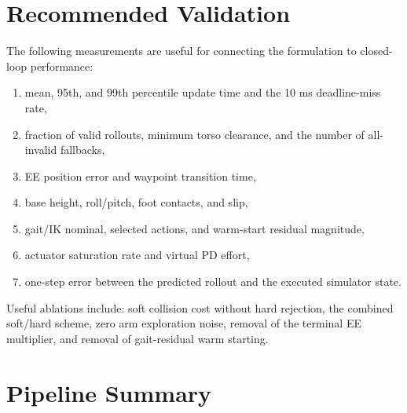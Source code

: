 \documentclass[11pt,a4paper]{article}
\begin{document}
\section{Recommended Validation}

The following measurements are useful for connecting the formulation to
closed-loop performance:
\begin{enumerate}
  \item mean, 95th, and 99th percentile update time and the 10 ms deadline-miss
        rate,
  \item fraction of valid rollouts, minimum torso clearance, and the number of
        all-invalid fallbacks,
  \item EE position error and waypoint transition time,
  \item base height, roll/pitch, foot contacts, and slip,
  \item gait/IK nominal, selected actions, and warm-start residual magnitude,
  \item actuator saturation rate and virtual PD effort,
  \item one-step error between the predicted rollout and the executed
        simulator state.
\end{enumerate}

Useful ablations include: soft collision cost without hard rejection, the
combined soft/hard scheme, zero arm exploration noise, removal of the terminal
EE multiplier, and removal of gait-residual warm starting.

\section{Pipeline Summary}
\end{document}
